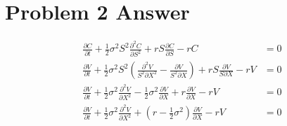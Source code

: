 \documentclass{article}
\begin{document}
\section*{Problem 2 Answer}
\begin{equation*}
    \begin{aligned}
        \frac{\partial C}{\partial t} + \frac{1}{2}\sigma^{2}S^{2}\frac{\partial^{2} C}{\partial S^{2}}+rS\frac{\partial C}{\partial S}-rC                                                     & =0 \\
        \frac{\partial V}{\partial t} + \frac{1}{2}\sigma^{2}S^{2}\left(\frac{\partial^{2} V}{S^2 \partial X^2}-\frac{\partial V}{S^2 \partial X}\right)+rS\frac{\partial V}{S \partial X}-rV & =0 \\
        \frac{\partial V}{\partial t} +\frac{1}{2}\sigma^{2} \frac{\partial^2 V}{\partial X^2} - \frac{1}{2}\sigma^{2} \frac{\partial V}{\partial X} + r\frac{\partial V}{\partial X}-rV & =0 \\
        \frac{\partial V}{\partial t} +\frac{1}{2}\sigma^{2} \frac{\partial^2 V}{\partial X^2}  + (r- \frac{1}{2}\sigma^{2})\frac{\partial V}{\partial X}-rV & =0 \\        
    \end{aligned}
\end{equation*}
\end{document}
